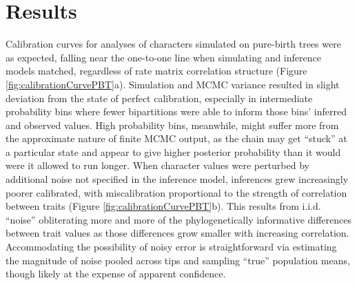 \clearpage


\section{Results}


Calibration curves for analyses of characters simulated on pure-birth trees were as expected, falling near the one-to-one line when simulating and inference models matched, regardless of rate matrix correlation structure (Figure \ref{fig:calibrationCurvePBT}a). Simulation and MCMC variance resulted in slight deviation from the state of perfect calibration, especially in intermediate probability bins where fewer bipartitions were able to inform those bins’ inferred and observed values. High probability bins, meanwhile, might suffer more from the approximate nature of finite MCMC output, as the chain may get “stuck” at a particular state and appear to give higher posterior probability than it would were it allowed to run longer. When character values were perturbed by additional noise not specified in the inference model, inferences grew increasingly poorer calibrated, with miscalibration proportional to the strength of correlation between traits (Figure \ref{fig:calibrationCurvePBT}b). This results from i.i.d. “noise” obliterating more and more of the phylogenetically informative differences between trait values as those differences grow smaller with increasing correlation. Accommodating the possibility of noisy error is straightforward via estimating the magnitude of noise pooled across tips and sampling “true” population means, though likely at the expense of apparent confidence.

